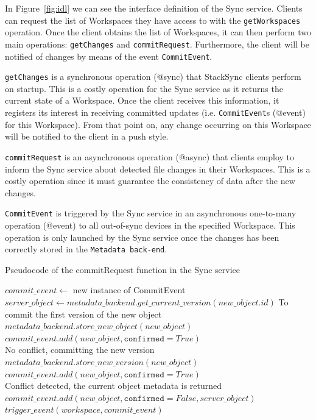 In Figure~\ref{fig:idl} we can see the interface definition of the Sync service. Clients can request the list of Workspaces they have access to with the \texttt{getWorkspaces} operation. Once the client obtains the list of Workspaces, it can then perform two main operations: \texttt{getChanges} and  \texttt{commitRequest}. Furthermore, the client will be notified of changes  by means of the event \texttt{CommitEvent}.

\texttt{getChanges} is a synchronous operation (@sync) that StackSync clients perform on startup. This is a costly operation for the Sync service as it returns the current state of a Workspace. Once the client receives this information, it registers its interest in receiving committed updates (i.e. \texttt{CommitEvent}s (@event) for this Workspace). From that point on, any change occurring on this Workspace will be notified to the client in a push style.

\texttt{commitRequest} is an asynchronous operation (@async) that clients employ to inform the Sync service about detected file changes in their Workspaces.  This is a  costly operation since it must guarantee the consistency of data after the new changes. 

\texttt{CommitEvent} is triggered by the Sync service in an asynchronous one-to-many operation (@event) to all out-of-sync devices in the specified Workspace. This operation is only launched by the Sync service once the changes has been correctly stored in the \texttt{Metadata back-end}.

\begin{algorithm}[h]
  \caption{Pseudocode of the commitRequest function in the Sync service}
    \label{alg:commit_pseudocode}
  \begin{algorithmic}[1]
  	\footnotesize
      \State $commit\_event \gets $ new instance of CommitEvent
      	\State $server\_object \gets metadata\_backend.get\_current\_version(new\_object.id)$
          	\Comment To commit the first version of the new object
        	\State $metadata\_backend.store\_new\_object(new\_object)$
        	\State $commit\_event.add(new\_object, \mathtt{confirmed} = True)$
         	\\ \Comment No conflict, committing the new version
			\State $metadata\_backend.store\_new\_version(new\_object)$
			\State $commit\_event.add(new\_object, \mathtt{confirmed} =True)$
        \Else
        	\\
        	\Comment Conflict detected, the current object metadata is returned
        	\State $commit\_event.add(new\_object, \mathtt{confirmed} = False,  server\_object)$
        \EndIf
      \EndFor 
      \State $trigger\_event(workspace, commit\_event)$
    \EndFunction
  \end{algorithmic}
\end{algorithm}


